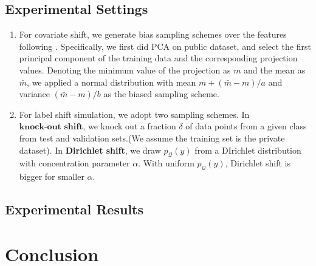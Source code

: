\documentclass{article}
\theoremstyle{definition}
\def\cQ{\mathcal{Q}}
\begin{document}
\subsection{Experimental Settings}
\begin{enumerate}
	\item For covariate shift, we generate bias sampling schemes over the features following \cite{gre_cov}. Specifically,  we first did PCA on public dataset, and select the first principal component of the training data and the corresponding projection values. Denoting the minimum value of the projection as $m$ and the mean as $\bar{m}$, we applied a normal distribution with mean $m + (\bar{m}-m)/a$ and variance $(\bar{m}-m)/b$ as the biased sampling scheme.
	\item For label shift simulation, we adopt two sampling schemes. In $\textbf{knock-out shift}$, we knock out a fraction $\delta$ of data points from a given class from test and validation sets.(We assume the training set is the private dataset). In \textbf{Dirichlet shift}, we draw $p_\cQ(y)$ from a DIrichlet distribution with concentration parameter $\alpha$. With uniform $p_{\cQ}(y)$, Dirichlet shift is bigger for smaller $\alpha$.
\end{enumerate}

\subsection{Experimental Results}

\section{Conclusion}



\end{document}
